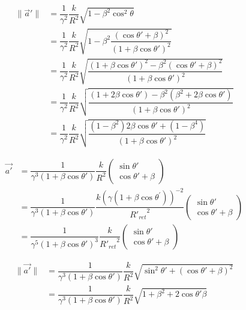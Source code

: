 \begin{equation}%
    \begin{aligned}
   \|\vec{a}'\| &=  \dfrac{1}{\gamma^2}\dfrac{k}{R^2} \sqrt{1 -\beta^2\cos^2{\theta}}\\
   &= \dfrac{1}{\gamma^2}\dfrac{k}{R^2} \sqrt{1 -\beta^2 \dfrac{(\cos\theta' + \beta)^2}{(1+\beta\cos\theta')^2}}\\
   &= \dfrac{1}{\gamma^2}\dfrac{k}{R^2} \sqrt{  \dfrac{(1+\beta\cos\theta')^2 - \beta^2(\cos\theta' + \beta)^2}{(1+\beta\cos\theta')^2}}\\
   &= \dfrac{1}{\gamma^2}\dfrac{k}{R^2} \sqrt{  \dfrac{(1+2\beta\cos\theta') - \beta^2(\beta^2 + 2 \beta\cos\theta')}{(1+\beta\cos\theta')^2}}\\
   &= \dfrac{1}{\gamma^2}\dfrac{k}{R^2} \sqrt{  \dfrac{(1-\beta^2)2\beta\cos\theta' + (1 - \beta^4)}{(1+\beta\cos\theta')^2}}
    \end{aligned}
\end{equation}%

\begin{equation}%
\begin{aligned}
\vec{a'} &= \dfrac{1}{\gamma^3( 1+\beta\cos\theta')} \dfrac{k}{R^2} \begin{pmatrix}
    \sin\theta' \\
     \cos\theta' + \beta
    \end{pmatrix}\\
    &= \dfrac{1}{\gamma^3( 1+\beta\cos\theta')} \dfrac{k\left(\gamma\left(1+\beta\cos\theta^{'}\right)\right)^{-2}}{{R'_{ret}}^2} \begin{pmatrix}
    \sin\theta' \\
     \cos\theta' + \beta
    \end{pmatrix}\\
    &= \dfrac{1}{\gamma^5( 1+\beta\cos\theta')^3} \dfrac{k}{{R'_{ret}}^2} \begin{pmatrix}
    \sin\theta' \\
     \cos\theta' + \beta
    \end{pmatrix}
\end{aligned}
\end{equation}%

\begin{equation}%
    \begin{aligned}
   \|\vec{a'}\| &=  \dfrac{1}{\gamma^3( 1+\beta\cos\theta')} \dfrac{k}{R^2}
    \sqrt{\sin^2\theta' + (\cos\theta' + \beta)^2} \\   &= \dfrac{1}{\gamma^3( 1+\beta\cos\theta')} \dfrac{k}{R^2}
    \sqrt{ 1 + \beta^2 +  2\cos\theta'\beta}
    \end{aligned}
\end{equation}%

